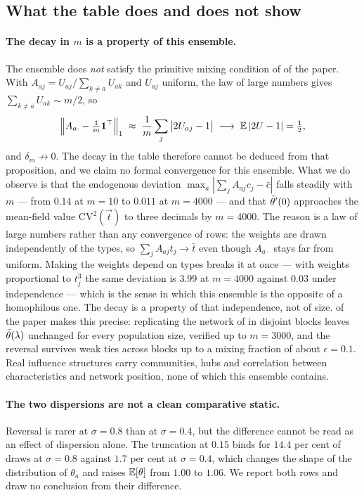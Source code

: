 \subsection*{What the table does and does not show}

\paragraph{The decay in $m$ is a property of this ensemble.}
The ensemble does \emph{not} satisfy the primitive mixing condition of
 of the paper. With
$A_{aj}=U_{aj}/\sum_{k\neq a}U_{ak}$ and $U_{aj}$ uniform, the law of large
numbers gives $\sum_{k\neq a}U_{ak}\sim m/2$, so
%
\begin{equation}
\Big\|A_{a\cdot}-\tfrac1m\mathbf 1^{\top}\Big\|_1
\;\approx\;\frac1m\sum_j\big|2U_{aj}-1\big|
\;\longrightarrow\;\mathbb{E}\,|2U-1|=\tfrac12 ,
\label{eq:notmixing}
\end{equation}
%
and $\delta_m\not\to0$. The decay in the table therefore cannot be deduced from
that proposition, and we claim no formal convergence for this ensemble. What we
do observe is that the endogenous deviation
$\max_a|\sum_jA_{aj}c_j-\bar c|$ falls steadily with $m$ --- from $0.14$ at
$m=10$ to $0.011$ at $m=4000$ --- and that $\bar\theta'(0)$ approaches the mean-field
value $\mathrm{CV}^{2}(\vec t)$ to three decimals by $m=4000$. The reason is a
law of large numbers rather than any convergence of rows: the weights are drawn
independently of the types, so $\sum_jA_{aj}t_j\to\bar t$ even though
$A_{a\cdot}$ stays far from uniform. Making the weights depend on types breaks
it at once --- with weights proportional to $t_j^{3}$ the same deviation is
$3.99$ at $m=4000$ against $0.03$ under independence --- which is the sense in
which this ensemble is the opposite of a homophilous one. The decay is a
property of that independence, not of size. 
of the paper makes this precise: replicating the network of  in
disjoint blocks leaves $\bar\theta(\lambda)$ unchanged for every population size,
verified up to $m=3000$, and the reversal survives weak ties across blocks up to
a mixing fraction of about $\epsilon=0.1$. Real influence structures carry
communities, hubs and correlation between characteristics and network position,
none of which this ensemble contains.

\paragraph{The two dispersions are not a clean comparative static.}
Reversal is rarer at $\sigma=0.8$ than at $\sigma=0.4$, but the difference
cannot be read as an effect of dispersion alone. The truncation at $0.15$ binds
for $14.4$ per cent of draws at $\sigma=0.8$ against $1.7$ per cent at
$\sigma=0.4$, which changes the shape of the distribution of $\theta_a$ and
raises $\mathbb{E}[\theta]$ from $1.00$ to $1.06$. We report both rows and draw no
conclusion from their difference.


